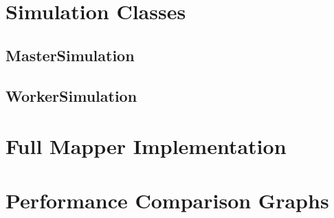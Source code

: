 \documentclass[12pt]{report}
\begin{document}
\begin{appendices}

\chapter{Simulation Classes}
\section{MasterSimulation}

\clearpage

\clearpage
\section{WorkerSimulation}

\clearpage

\clearpage
\chapter{Full Mapper Implementation}

\clearpage

\clearpage
\chapter{Performance Comparison Graphs}


\end{appendices}
\end{document}
